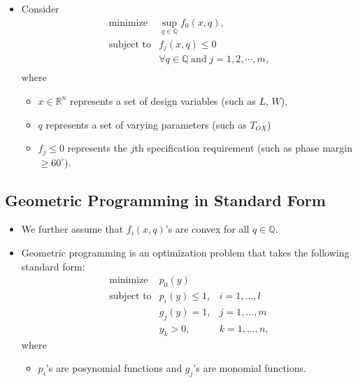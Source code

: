 \documentclass[
]{article}
\providecommand{\tightlist}{%
  \setlength{\itemsep}{0pt}\setlength{\parskip}{0pt}}
\begin{document}
\begin{itemize}
\tightlist
\item
  Consider \[\begin{array}{ll}
      \text{minimize}   & \sup_{q \in {\mathbb{Q}}} f_0(x,q), \\
      \text{subject to} & f_j(x,q) \leq 0 \qquad \\
      & \forall q \in {\mathbb{Q}} \; \text{and} \; j = 1,2,\cdots,m, \\
    \end{array}\] where

  \begin{itemize}
  \tightlist
  \item
    \(x \in {\mathbb{R}}^n\) represents a set of design variables
    (such as \(L\), \(W\)),
  \item
    \(q\) represents a set of varying parameters (such as \(T_{OX}\))
  \item
    \(f_j \leq 0\) represents the \(j\)th specification requirement (such
    as phase margin \(\geq 60^\circ\)).
  \end{itemize}
\end{itemize}

\hypertarget{geometric-programming-in-standard-form}{%
\subsection{Geometric Programming in Standard Form}\label{geometric-programming-in-standard-form}}

\begin{itemize}
\tightlist
\item
  We further assume that \(f_i(x,q)\)'s are convex for all \(q \in {\mathbb{Q}}\).
\item
  Geometric programming is an optimization problem that takes the following standard form:
  \[\begin{array}{lll}
      \text{minimize}   & p_0(y) &  \\
      \text{subject to} & p_i(y) \leq 1, & i=1,\ldots,l  \\
        & g_j(y) = 1, & j=1,\ldots,m  \\
        & y_k > 0,& k=1,\ldots,n ,
    \end{array}\] where

  \begin{itemize}
  \tightlist
  \item
    \(p_i\)'s are posynomial functions and \(g_j\)'s are monomial functions.
  \end{itemize}
\end{itemize}
\end{document}
